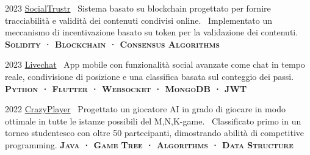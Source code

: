 \documentclass{tccv}
\begin{document}
\begin{yearlist}

\item{2023}
     {\href{https://github.com/manuelarto/socialtrustr}{SocialTrustr}}
     {\textbullet~Sistema basato su blockchain progettato per fornire tracciabilità e validità dei contenuti condivisi online. \newline
     \textbullet~Implementato un meccanismo di incentivazione basato su token per la validazione dei contenuti. \newline
     \textbf{\textsc{Solidity · Blockchain · Consensus Algorithms}}}
\item{2023}
     {\href{https://github.com/manuelarto/livechat}{Livechat}}
     {\textbullet~App mobile con funzionalità social avanzate come chat in tempo reale, condivisione di posizione e una classifica basata sul conteggio dei passi. \newline
     \textbf{\textsc{Python · Flutter · Websocket · MongoDB · JWT}}}
\item{2022}
     {\href{https://github.com/manuelarto/crazyplayer}{CrazyPlayer}}
     {\textbullet~Progettato un giocatore AI in grado di giocare in modo ottimale in tutte le istanze possibili del M,N,K-game. \newline
     \textbullet~Classificato primo in un torneo studentesco con oltre 50 partecipanti, dimostrando abilità di competitive programming. \newline
     \textbf{\textsc{Java · Game Tree · Algorithms · Data Structure}}}

\end{yearlist}






\end{document}
